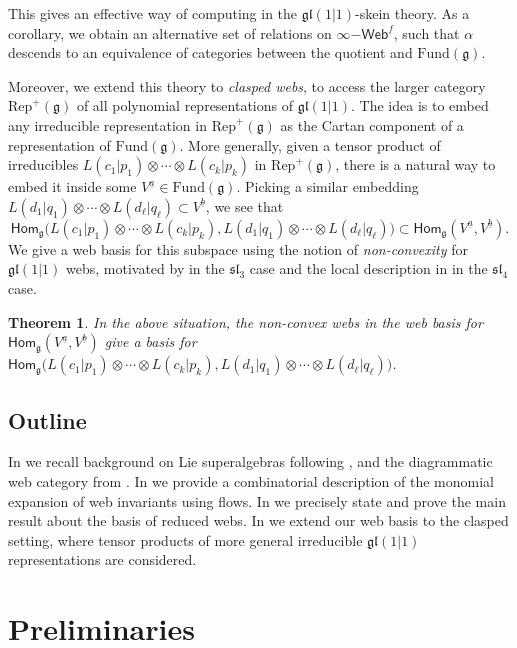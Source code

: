 \documentclass[11pt,a4paper,reqno]{amsart}
\newcommand{\g}{\mathfrak{g}}
\newcommand{\gl}{\mathfrak{gl}}
\newcommand{\rep}{\mathrm{Rep}}
\renewcommand{\a}{\alpha}
\renewcommand{\b}{\mathfrak{b}}
\renewcommand{\sl}{\mathfrak{sl}}
\numberwithin{equation}{section}
\renewcommand{\hom}{\mathsf{Hom}}
\renewcommand{\a}{\underline a}
\renewcommand{\b}{\underline b}
\newtheorem{thm}{Theorem}[section]
\theoremstyle{definition}
\theoremstyle{remark}
\begin{document}
This gives an effective way of computing in the $\gl(1|1)$-skein theory. As a corollary, we obtain an alternative set of relations on $\infty\mathsf{-Web}^f$, such that $\alpha$ descends to an equivalence of categories between the quotient and $\mathrm{Fund}(\g)$.

Moreover, we extend this theory to \emph{clasped webs}, to access the larger category $\rep^+(\g)$ of all polynomial representations of $\gl(1|1)$. The idea is to embed any irreducible representation in $\rep^+(\g)$ as the Cartan component of a representation of $\mathrm{Fund}(\g)$. More generally, given a tensor product of irreducibles $L(c_1|p_1)\otimes \cdots\otimes L(c_k|p_k)$ in $\rep^+(\g)$, there is a natural way to embed it inside some $V^{\a}\in \mathrm{Fund}(\g)$. Picking a similar embedding $L(d_1|q_1)\otimes \cdots \otimes L(d_\ell|q_\ell)\subset V^{\b}$, we see that
\[\hom_\g\big(L(c_1|p_1)\otimes \cdots\otimes L(c_k|p_k), L(d_1|q_1)\otimes \cdots \otimes L(d_\ell|q_\ell)\big) \subset \hom_\g(V^{\a}, V^{\b}).\]
We give a web basis for this subspace using the notion of \emph{non-convexity} for $\gl(1|1)$ webs, motivated by \cite{Kuperberg} in the $\sl_3$ case and the local description in \cite{enugandla-gaetz} in the $\sl_4$ case.
\begin{thm}
    In the above situation, the non-convex webs in the web basis for $\hom_\g(V^{\a}, V^{\b})$ give a basis for $\hom_\g\big(L(c_1|p_1)\otimes \cdots\otimes L(c_k|p_k), L(d_1|q_1)\otimes \cdots \otimes L(d_\ell|q_\ell)\big)$. 
\end{thm}

\subsection{Outline}

In  we recall background on Lie superalgebras following \cite{cheng-wang}, and the diagrammatic web category from \cite{tubbenhauer-vaz-wedrich}. In  we provide a combinatorial description of the monomial expansion of web invariants using flows. In  we precisely state and prove the main result about the basis of reduced webs. In  we extend our web basis to the clasped setting, where tensor products of more general irreducible $\gl(1|1)$ representations are considered.

\section{Preliminaries}
\label{sec:prelim}
\end{document}
